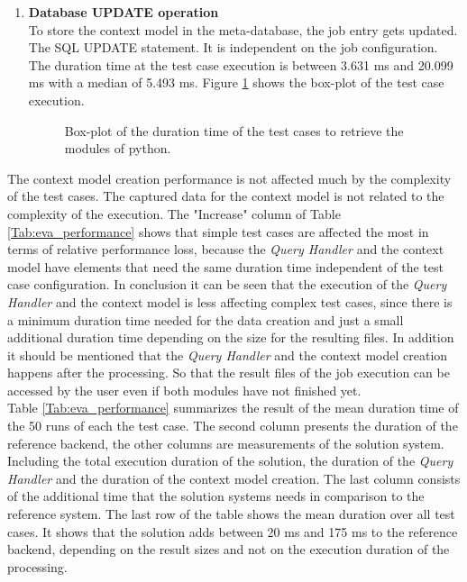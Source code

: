 \documentclass[draft,final]{vutinfth} %
\begin{document}
\begin{enumerate}
	\item \textbf{Database UPDATE operation} \\
	To store the context model in the meta-database, the job entry gets updated. The SQL UPDATE statement. It is independent on the job configuration. The duration time at the test case execution is between 3.631 ms and 20.099 ms with a median of 5.493 ms. Figure \ref{fig:evaluation_perf_database} shows the box-plot of the test case execution. 
	
	\begin{figure}[!h]
		\centering
		\caption{Box-plot of the duration time of the test cases to retrieve the modules of python.}
		\label{fig:evaluation_perf_database}		
	\end{figure}
	
\end{enumerate}

The context model creation performance is not affected much by the complexity of the test cases. The captured data for the context model is not related to the complexity of the execution. The "Increase" column of Table \ref{Tab:eva_performance} shows that simple test cases are affected the most in terms of relative performance loss, because the \textit{Query Handler} and the context model have elements that need the same duration time independent of the test case configuration. In conclusion it can be seen that the execution of the \textit{Query Handler} and the context model is less affecting complex test cases, since there is a minimum duration time needed for the data creation and just a small additional duration time depending on the size for the resulting files. In addition it should be mentioned that the \textit{Query Handler} and the context model creation happens after the processing. So that the result files of the job execution can be accessed by the user even if both modules have not finished yet. \\
Table \ref{Tab:eva_performance} summarizes the result of the mean duration time of the 50 runs of each the test case. The second column presents the duration of the reference backend, the other columns are measurements of the solution system. Including the total execution duration of the solution, the duration of the \textit{Query Handler} and the duration of the context model creation. The last column consists of the additional time that the solution systems needs in comparison to the reference system. The last row of the table shows the mean duration over all test cases. It shows that the solution adds between 20 ms and 175 ms to the reference backend, depending on the result sizes and not on the execution duration of the processing.
\end{document}
